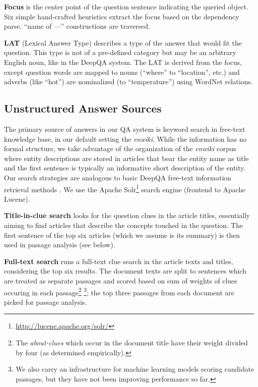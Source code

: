 \documentclass{poster15}
\begin{document}
\textbf{Focus} is the center point of the question sentence
indicating the queried object.
Six simple hand-crafted heuristics extract the focus based on the dependency parse.
``name of ---'' constructions are traversed.

\textbf{LAT} (Lexical Answer Type) describes a type of the answer that would fit the question.
This type is not of a pre-defined category but may be an arbitrary English noun,
like in the DeepQA system. \cite{WatsonTyCor}
The LAT is derived from the focus, except question words are mapped to nouns
(``where'' to ``location'', etc.)
and adverbs (like ``hot'') are nominalized (to ``temperature'') using WordNet relations.

\subsection{Unstructured Answer Sources}

The primary source of answers in our QA system is keyword search in free-text knowledge base,
in our default setting the \textit{enwiki}.
While the information has no formal structure, we take advantage of the organization of the \textit{enwiki} corpus
where entity descriptions are stored in articles that bear the entity name as title
and the first sentence is typically an informative short description of the entity.
Our search strategies are analogous to basic DeepQA free-text information retrieval methods \cite{WatsonIR}.
We use the Apache Solr\footnote{\url{http://lucene.apache.org/solr/}} search engine (frontend to Apache Lucene).

\textbf{Title-in-clue search} \cite{WatsonIR} looks for the question clues in the article titles,
essentially aiming to find articles that describe the concepts touched in the question.
The first sentence of the top six articles (which we assume is its summary)
is then used in passage analysis (see below).

\textbf{Full-text search} \cite{WatsonIR} runs a full-text clue search in the article texts and titles,
considering the top six results.
The document texts are split to sentences which are treated as separate passages
and scored based on sum of weights of clues occuring in each passage\footnote{%
The \textit{about-clues} which occur in the document title have their weight divided by four (as determined empirically).}%
\footnote{We also carry an infrastructure for machine learning models scoring candidate passages,
		but they have not been improving performance so far.};
the top three passages from each document are picked for passage analysis.
\end{document}
